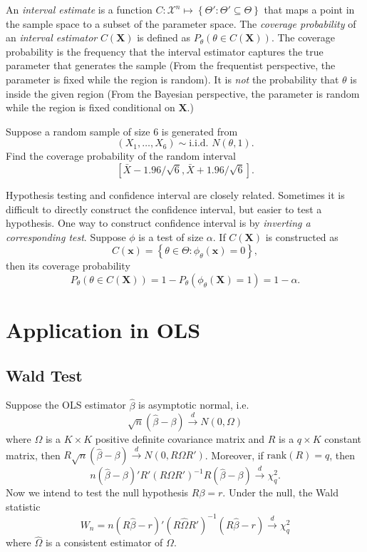 \documentclass[11pt]{article}
\begin{document}
An \emph{interval estimate} is a function
\(C:\mathcal{X}^{n}\mapsto\left\{ \Theta':\Theta'\subseteq\Theta\right\}\)
that maps a point in the sample space to a subset of the parameter
space. The \emph{coverage probability} of an \emph{interval estimator}
\(C\left(\mathbf{X}\right)\) is defined as
\(P_{\theta}\left(\theta\in C\left(\mathbf{X}\right)\right)\). The
coverage probability is the frequency that the interval estimator
captures the true parameter that generates the sample (From the
frequentist perspective, the parameter is fixed while the region is
random). It is \emph{not} the probability that \(\theta\) is inside the
given region (From the Bayesian perspective, the parameter is random
while the region is fixed conditional on \(\mathbf{X}\).)

Suppose a random sample of size 6 is generated from
\[\left(X_{1},\ldots,X_{6}\right)\sim\text{i.i.d. }N\left(\theta,1\right).\]
Find the coverage probability of the random interval
\[\left[\bar{X}-1.96/\sqrt{6},\bar{X}+1.96/\sqrt{6}\right].\]

Hypothesis testing and confidence interval are closely related.
Sometimes it is difficult to directly construct the confidence interval,
but easier to test a hypothesis. One way to construct confidence
interval is by \emph{inverting a corresponding test}. Suppose \(\phi\)
is a test of size \(\alpha\). If \(C\left(\mathbf{X}\right)\) is
constructed as
\[C\left(\mathbf{x}\right)=\left\{ \theta\in\Theta:\phi_{\theta}\left(\mathbf{x}\right)=0\right\},\]
then its coverage probability
\[P_{\theta}\left(\theta\in C\left(\mathbf{X}\right)\right)=1-P_{\theta}\left(\phi_{\theta}\left(\mathbf{X}\right)=1\right)=1-\alpha.\]

    \section{Application in OLS}\label{application-in-ols}

\subsection{Wald Test}\label{wald-test}

Suppose the OLS estimator \(\widehat{\beta}\) is asymptotic normal, i.e.
\[\sqrt{n}\left(\widehat{\beta}-\beta\right)\stackrel{d}{\to}N\left(0,\Omega\right)\]
where \(\Omega\) is a \(K\times K\) positive definite covariance matrix
and \(R\) is a \(q\times K\) constant matrix, then
\(R\sqrt{n}\left(\widehat{\beta}-\beta\right)\stackrel{d}{\to}N\left(0,R\Omega R'\right)\).
Moreover, if \(\mbox{rank}\left(R\right)=q\), then
\[n\left(\widehat{\beta}-\beta\right)'R'\left(R\Omega R'\right)^{-1}R\left(\widehat{\beta}-\beta\right)\stackrel{d}{\to}\chi_{q}^{2}.\]
Now we intend to test the null hypothesis \(R\beta=r\). Under the null,
the Wald statistic
\[W_{n}=n\left(R\widehat{\beta}-r\right)'\left(R\widehat{\Omega}R'\right)^{-1}\left(R\widehat{\beta}-r\right)\stackrel{d}{\to}\chi_{q}^{2}\]
where \(\widehat{\Omega}\) is a consistent estimator of \(\Omega\).
\end{document}
